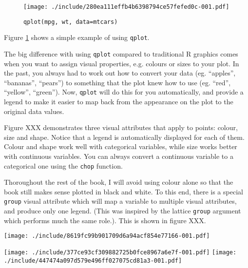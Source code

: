 \begin{figure}[htbp]
	\begin{center}
\texttt{[image: ./include/280ea111effb4b6398794ce57fefed0c-001.pdf]}
	\end{center}
	\caption{{\tt qplot(mpg, wt, data=mtcars)}}
	
	\label{fig:first}
\end{figure}

Figure \ref{fig:first} shows a simple example of using {\tt qplot}.

The big difference with using {\tt qplot} compared to traditional R graphics comes when you want to assign visual properties, e.g. colours or sizes to your plot.  In the past, you always had to work out how to convert your data (eg. ``apples'', ``bananas'', ``pears'') to something that the plot knew how to use (eg. ``red'', ``yellow'', ``green'').  Now, {\tt qplot} will do this for you automatically, and provide a legend to make it easier to map back from the appearance on the plot to the original data values.

Figure XXX demonstrates three visual attributes that apply to points: colour, size and shape.   Notice that a legend is automatically displayed for each of them.  Colour and shape work well with categorical variables, while size works better with continuous variables.  You can always convert a continuous variable to a categorical one using the {\tt chop} function.

Thoroughout the rest of the book, I will avoid using colour alone so that the book still makes sense plotted in black and white.  To this end, there is a special {\tt group} visual attribute which will map a variable to multiple visual attributes, and produce only one legend.  (This was inspired by the lattice {\tt group} argument which performs much the same role.).  This is shown in figure XXX.

\texttt{[image: ./include/8619fc99b901709d6a94acf854e77166-001.pdf]}

\texttt{[image: ./include/377ce93cf309882725b0fce8967a6e7f-001.pdf]}
\texttt{[image: ./include/447474a097d579e496ff027075cd81a3-001.pdf]}

